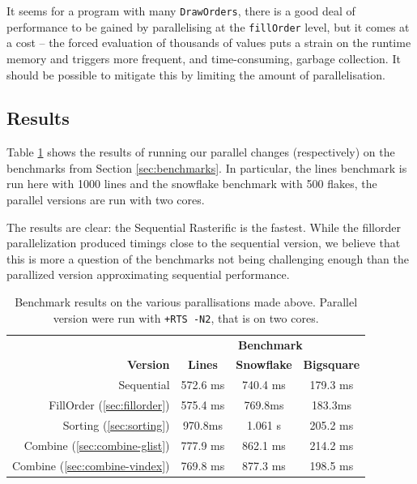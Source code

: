 \documentclass[12pt, a4paper]{article}
\begin{document}
It seems for a program with many \texttt{DrawOrders}, there is a good deal of performance to be gained by parallelising at the \texttt{fillOrder} level, but it comes at a cost -- the forced evaluation of thousands of values puts a strain on the runtime memory and triggers more frequent, and time-consuming, garbage collection. It should be possible to mitigate this by limiting the amount of parallelisation.


\subsection{Results}

Table \ref{tab:benchmark-results} shows the results of running our parallel changes (respectively)
on the benchmarks from Section \ref{sec:benchmarks}. In particular, the lines benchmark is run
here with 1000 lines and the snowflake benchmark with 500 flakes, the parallel versions are
 run with two cores.

 The results are clear: the Sequential Rasterific is the fastest. While the fillorder parallelization
 produced timings close to the sequential version, we believe that this is more a question of the
 benchmarks not being challenging enough than the parallized version approximating sequential
  performance.
\begin{table}[h!]
  \centering
  \begin{tabular}[h!]{|r|c|c|c|}\hline
    & \multicolumn{3}{|c|}{\textbf{Benchmark}} \\
    \textbf{Version}&\textbf{Lines}&\textbf{Snowflake}&\textbf{Bigsquare} \\\hline
    Sequential & 572.6 ms & 740.4 ms & 179.3 ms \\
    FillOrder (\ref{sec:fillorder}) &  575.4 ms & 769.8ms & 183.3ms \\
    Sorting (\ref{sec:sorting}) &970.8ms& 1.061 s & 205.2 ms \\
    Combine (\ref{sec:combine-glist}) & 777.9 ms & 862.1 ms & 214.2 ms \\
    Combine (\ref{sec:combine-vindex}) & 769.8 ms & 877.3 ms & 198.5 ms \\\hline
  \end{tabular}                                       
  \caption{Benchmark results on the various parallisations made above. Parallel version were run with
   \texttt{+RTS -N2}, that is on two cores.}                         
  \label{tab:benchmark-results}
\end{table}
\end{document}
